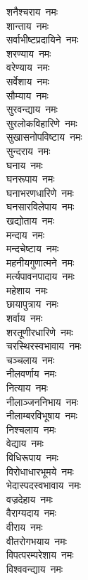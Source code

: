 \begin{flushleft}
\begin{multicols}{2}
शनैश्चराय~नमः\\
शान्ताय~नमः\\
सर्वाभीष्टप्रदायिने~नमः\\
शरण्याय~नमः\\
वरेण्याय~नमः\\
सर्वेशाय~नमः\\
सौम्याय~नमः\\
सुरवन्द्याय~नमः\\
सुरलोकविहारिणे~नमः\\
सुखासनोपविष्टाय~नमः\hfill{}\\
सुन्दराय~नमः\\
घनाय~नमः\\
घनरूपाय~नमः\\
घनाभरणधारिणे~नमः\\
घनसारविलेपाय~नमः\\
खद्योताय~नमः\\
मन्दाय~नमः\\
मन्दचेष्टाय~नमः\\
महनीयगुणात्मने~नमः\\
मर्त्यपावनपादाय~नमः\hfill{}\\
महेशाय~नमः\\
छायापुत्राय~नमः\\
शर्वाय~नमः\\
शरतूणीरधारिणे~नमः\\
चरस्थिरस्वभावाय~नमः\\
चञ्चलाय~नमः\\
नीलवर्णाय~नमः\\
नित्याय~नमः\\
नीलाञ्जननिभाय~नमः\\
नीलाम्बरविभूषाय~नमः\hfill{}\\
निश्चलाय~नमः\\
वेद्याय~नमः\\
विधिरूपाय~नमः\\
विरोधाधारभूमये~नमः\\
भेदास्पदस्वभावाय~नमः\\
वज्रदेहाय~नमः\\
वैराग्यदाय~नमः\\
वीराय~नमः\\
वीतरोगभयाय~नमः\\
विपत्परम्परेशाय~नमः\hfill{}\\
विश्ववन्द्याय~नमः\\

\end{multicols}
\end{flushleft}
